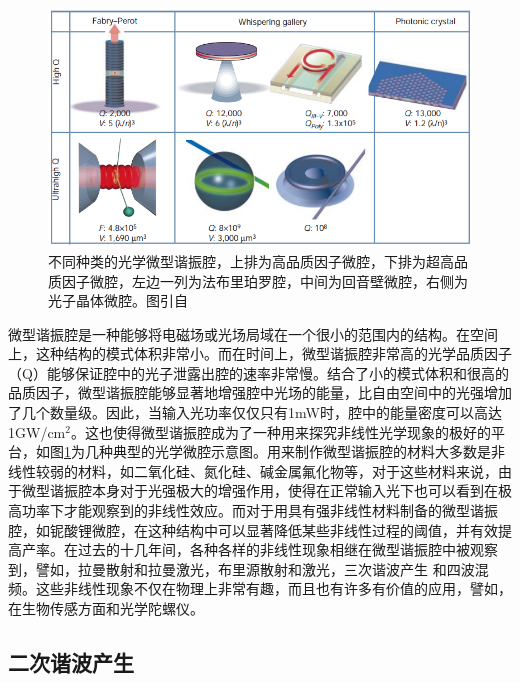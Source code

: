 \documentclass[UTF8,a4paper,cs4size,hyperref]{ctexart}
\begin{document}
\begin{figure}
\centering
\includegraphics[width=14cm]{Microcavity}
\caption{不同种类的光学微型谐振腔，上排为高品质因子微腔，下排为超高品质因子微腔，左边一列为法布里珀罗腔，中间为回音壁微腔，右侧为光子晶体微腔。图引自\cite{vahala2003optical}}
\label{pic:Microcavity}
\end{figure}

微型谐振腔是一种能够将电磁场或光场局域在一个很小的范围内的结构。在空间上，这种结构的模式体积非常小。而在时间上，微型谐振腔非常高的光学品质因子（Q）能够保证腔中的光子泄露出腔的速率非常慢。结合了小的模式体积和很高的品质因子，微型谐振腔能够显著地增强腔中光场的能量，比自由空间中的光强增加了几个数量级。因此，当输入光功率仅仅只有1mW时，腔中的能量密度可以高达1GW/cm$^2$\cite{vahala2003optical}。这也使得微型谐振腔成为了一种用来探究非线性光学现象的极好的平台，如图\ref{pic:Microcavity}为几种典型的光学微腔示意图。用来制作微型谐振腔的材料大多数是非线性较弱的材料，如二氧化硅、氮化硅、碱金属氟化物等，对于这些材料来说，由于微型谐振腔本身对于光强极大的增强作用，使得在正常输入光下也可以看到在极高功率下才能观察到的非线性效应。而对于用具有强非线性材料制备的微型谐振腔，如铌酸锂微腔，在这种结构中可以显著降低某些非线性过程的阈值，并有效提高产率。在过去的十几年间，各种各样的非线性现象相继在微型谐振腔中被观察到，譬如，拉曼散射和拉曼激光\cite{spillane2002ultralow, cai2000fiber, kippenberg2004ultralow}，布里源散射和激光\cite{li2012characterization, li2013microwave, li2014low, loh2015dual}，三次谐波产生\cite{carmon2007visible, farnesi2014optical}	和四波混频\cite{kippenberg2004kerr}。这些非线性现象不仅在物理上非常有趣，而且也有许多有价值的应用，譬如，在生物传感方面\cite{ozdemir2014highly}和光学陀螺仪\cite{li2015microresonator}。

\subsection{二次谐波产生}
\end{document}

